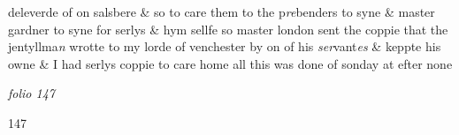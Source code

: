 \documentclass[12pt, a4paper]{book}
\begin{document}
				\marginpar[\vspace{0.5cm}{\textcolor{Gray}{Salisbery}}]{}
			
		\ifthenelse{\isodd{\thepage}}
		{\reversemarginpar}
		{\normalmarginpar}
		deleverde of on salsbere \& so to care them to the p\textit{re}benders to
 syne \& master gardner to syne for serlys \& hym sellfe so
 		master london sent the coppie that the jentyllma\textit{n} wrotte
 		to my lorde of venchester by on of his \textit{ser}vant\textit{es} \& keppte
 his owne \& I had serlys coppie to care home all this
 was done of sonday at efter none

\dotfill
					

\textit{folio 147}


\begin{flushright}{\color{Mahogany}147}\end{flushright}
 	
\end{document}
